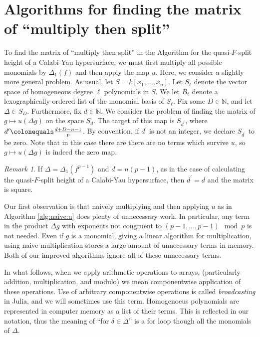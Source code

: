 \documentclass[a4paper]{article}
\theoremstyle{definition}
\theoremstyle{remark}
\newtheorem{rmk}[thm]{Remark}
\begin{document}
\section{Algorithms for finding the matrix of ``multiply then split''}


To find the matrix of ``multiply then split''
in the Algorithm for the quasi-\(F\)-split height
of a Calabi-Yau hypersurface, 
we must first multiply all possible 
monomials by \(\Delta_{1}(f)\) 
and then apply the map \(u\).
Here, we consider a slightly more general problem.
As usual, let \(S = k[x_{1}, \ldots, x_{n}]\).
Let $S_\ell$ denote the vector space of homogeneous degree $\ell$ polynomials in \(S\).
We let \(B_{\ell}\) denote a lexographically-ordered list
of the monomial basis of \(S_{\ell}\).
Fix some \(D \in \mathbb{N}\), and let \(\Delta \in S_D\).
Furthermore, fix \(d \in \mathbb{N}\).
We consider the problem of finding the matrix of 
\(g \mapsto u(\Delta g)\)
on the space \(S_{d}\).
The target of this map is
\(S_{d^{\prime}}\), where
\(d^{\prime} \colonequals \frac{d+D-n-1}{p}\).
By convention, if \(d^{\prime}\) is not an integer,
we declare \(S_{d^{\prime}}\) to be zero.
Note that in this case there are
there are no terms which survive \(u\), so
\(g \mapsto u(\Delta g)\) is indeed the zero map.

\begin{rmk}
    If \(\Delta = \Delta_{1}(f^{p-1})\) and \(d = n(p-1)\),
	as in the case of calculating the quasi-\(F\)-split
	height of a Calabi-Yau hypersurface, 
	then \(d^{\prime} = d\) and the matrix is 
	square.
\end{rmk}

Our first observation is that naively 
multiplying and then applying \(u\) 
as in Algorithm \ref{alg:naive:u}
does plenty of unnecessary work.
In particular, any term in the 
product \(\Delta g\) with exponents 
not congruent to 
\((p-1, \ldots, p-1) \mod p\)
is not needed. 
Even if \(g\) is a monomial, giving a linear
algorithm for multiplication, using naive
multiplication stores a large amount of unnecessary terms
in memory.
Both of our improved algorithms ignore
all of these unnecessary terms.

In what follows, 
when we apply arithmetic operations to arrays, 
(particularly addition, multiplication, and modulo)
we mean componentwise application of these operations.
Use of arbitrary componentwise operations is called
\textit{broadcasting} in Julia, and we will
sometimes use this term.
Homogenoeus polynomials are represented in computer 
memory as a list of their terms. 
This is reflected in our notation, 
thus the meaning of ``for \(\delta \in \Delta\)''
is a for loop though all the monomials
of \(\Delta\).
\end{document}
